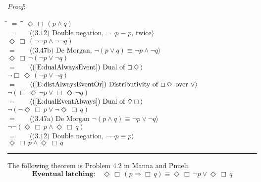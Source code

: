\documentclass[12pt, fleqn, leqno]{article}
\newcommand{\lgap}{2pt}                             %
\newcommand{\mymathindent}{24pt}                    %
\newcommand{\impl}{\ensuremath{\Rightarrow}}        %
\newcommand{\Event}{\Diamond\,}
\newcommand{\Always}{\Box\,}
\newcommand{\myqed}{\rule[-.23ex]{1.2ex}{2.0ex}}
\newcommand{\myqedtab}{\hspace{384pt}}              %
\newcommand{\Gll} {\langle}                         %
\newcommand{\Ggg} {\rangle}                         %
\newcommand{\Hint}[1]     {\ \ \ $\Gll              \mbox{#1} \Ggg$ }   %
\begin{document}
\emph{Proof}:
\begin{tabbing}
\hspace{\mymathindent} \= $= \;$ \= \myqedtab \= \kill
  \> \>   $\Event\Always (p\land q)$\\[\lgap]
  \> $=$  \>  \Hint{(3.12) Double negation, $\neg\neg p\equiv p$, twice}\\[\lgap]
  \> \>   $\Event\Always (\neg\neg p\land \neg\neg q)$\\[\lgap]
  \> $=$  \>  \Hint{(3.47b) De Morgan, $\neg (p \lor q) \equiv \neg p \land \neg q$}\\[\lgap]
  \> \>   $\Event\Always \neg(\neg p\lor \neg q)$\\[\lgap]
  \> $=$  \>  \Hint{(\ref{E:dualAlwaysEvent}) Dual of $\Always\Event$}\\[\lgap]
  \> \>   $\neg\Always\Event (\neg p\lor \neg q)$\\[\lgap]
  \> $=$  \>  \Hint{(\ref{E:distAlwaysEventOr}) Distributivity of $\Always\Event$ over $\lor$}\\[\lgap]
  \> \>   $\neg(\Always\Event \neg p\lor \Always\Event \neg q)$\\[\lgap]
  \> $=$  \>  \Hint{(\ref{E:dualEventAlways}) Dual of $\Event\Always$}\\[\lgap]
  \> \>   $\neg(\neg \Event\Always p\lor  \neg \Event\Always q)$\\[\lgap]
  \> $=$  \>  \Hint{(3.47a) De Morgan $\neg (p \land q) \equiv \neg p \lor \neg q$}\\[\lgap]
  \> \>   $\neg\neg (\Event\Always p\land \Event\Always q)$\\[\lgap]
  \> $=$  \>  \Hint{(3.12) Double negation, $\neg\neg p\equiv p$}\\[\lgap]
  \> \>   $\Event\Always p\land \Event\Always q$ \quad \myqed
\end{tabbing}

The following theorem is Problem 4.2 in Manna and Pnueli. \cite{Manna}
\begin{equation}\label{E:eventualLatching}
\textbf{Eventual latching:}\quad \Event\Always(p\impl \Always q) \equiv \Event\Always\neg p \lor \Event\Always q
\end{equation}
\end{document}
